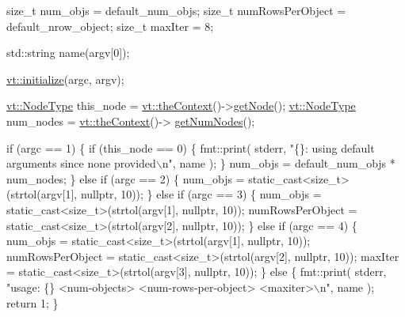 \begin{DoxyCodeInclude}
  \textcolor{keywordtype}{size\_t} num\_objs = default\_num\_objs;
  \textcolor{keywordtype}{size\_t} numRowsPerObject = default\_nrow\_object;
  \textcolor{keywordtype}{size\_t} maxIter = 8;

  std::string name(argv[0]);

  \hyperlink{namespacevt_aaa266774ea8339c58be0202b00fafa62}{vt::initialize}(argc, argv);

  \hyperlink{namespacevt_a866da9d0efc19c0a1ce79e9e492f47e2}{vt::NodeType} this\_node = \hyperlink{namespacevt_a26551fe0e6e6a1371111df5b12c7e92c}{vt::theContext}()->\hyperlink{structvt_1_1ctx_1_1_context_a0d52c263ce8516546a67443d9a86fa5f}{getNode}();
  \hyperlink{namespacevt_a866da9d0efc19c0a1ce79e9e492f47e2}{vt::NodeType} num\_nodes = \hyperlink{namespacevt_a26551fe0e6e6a1371111df5b12c7e92c}{vt::theContext}()->
      \hyperlink{structvt_1_1ctx_1_1_context_a7f41071aadf6d5fa9e1b6c703c5ff19d}{getNumNodes}();

  \textcolor{keywordflow}{if} (argc == 1) \{
    \textcolor{keywordflow}{if} (this\_node == 0) \{
      fmt::print(
        stderr, \textcolor{stringliteral}{"\{\}: using default arguments since none provided\(\backslash\)n"}, name
      );
    \}
    num\_objs = default\_num\_objs * num\_nodes;
  \} \textcolor{keywordflow}{else} \textcolor{keywordflow}{if} (argc == 2) \{
    num\_objs = \textcolor{keyword}{static\_cast<}\textcolor{keywordtype}{size\_t}\textcolor{keyword}{>}(strtol(argv[1], \textcolor{keyword}{nullptr}, 10));
  \}
  \textcolor{keywordflow}{else} \textcolor{keywordflow}{if} (argc == 3) \{
    num\_objs = \textcolor{keyword}{static\_cast<}\textcolor{keywordtype}{size\_t}\textcolor{keyword}{>}(strtol(argv[1], \textcolor{keyword}{nullptr}, 10));
    numRowsPerObject = \textcolor{keyword}{static\_cast<}\textcolor{keywordtype}{size\_t}\textcolor{keyword}{>}(strtol(argv[2], \textcolor{keyword}{nullptr}, 10));
  \}
  \textcolor{keywordflow}{else} \textcolor{keywordflow}{if} (argc == 4) \{
    num\_objs = \textcolor{keyword}{static\_cast<}\textcolor{keywordtype}{size\_t}\textcolor{keyword}{>}(strtol(argv[1], \textcolor{keyword}{nullptr}, 10));
    numRowsPerObject = \textcolor{keyword}{static\_cast<}\textcolor{keywordtype}{size\_t}\textcolor{keyword}{>}(strtol(argv[2], \textcolor{keyword}{nullptr}, 10));
    maxIter = \textcolor{keyword}{static\_cast<}\textcolor{keywordtype}{size\_t}\textcolor{keyword}{>}(strtol(argv[3], \textcolor{keyword}{nullptr}, 10));
  \}
  \textcolor{keywordflow}{else} \{
    fmt::print(
      stderr, \textcolor{stringliteral}{"usage: \{\} <num-objects> <num-rows-per-object> <maxiter>\(\backslash\)n"},
      name
    );
    \textcolor{keywordflow}{return} 1;
  \}


\end{DoxyCodeInclude}
